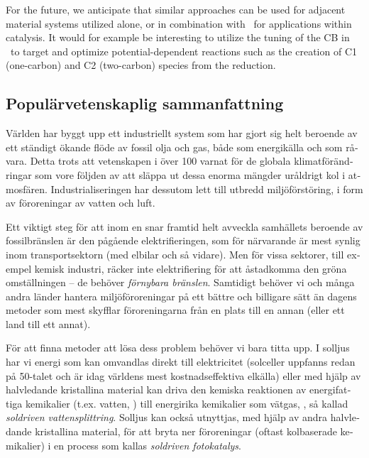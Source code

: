 \documentclass[webedition,openright,titles,swedish,english]{LuaUUThesis}\usepackage[]{graphicx}\usepackage[]{xcolor}
\begin{document}
For the future, we anticipate that similar approaches can be used for adjacent
material systems utilized alone, or in combination with \ZnO\ for applications
within catalysis.
It would for example be interesting to utilize the tuning of
the \gls{CB} in \ZnO\ to target and optimize potential-dependent reactions
such as the creation of C1 (one-carbon) and C2 (two-carbon) species from the  reduction.






\begin{otherlanguage}{swedish}
\chapter{Populärvetenskaplig sammanfattning}
\label{ch:sammanfattning}

%

Världen har byggt upp ett industriellt system som har gjort sig helt
beroende av ett ständigt ökande flöde av fossil olja och gas, både som
energikälla och som råvara.
Detta trots att vetenskapen i över \qty{100}{\yearswe} varnat för de globala
klimatförändringar som vore följden av att släppa ut dessa enorma mängder
uråldrigt kol i atmosfären.
Industrialiseringen har dessutom lett till utbredd miljöförstöring, i form av
föroreningar av vatten och luft.

Ett viktigt steg för att inom en snar framtid helt avveckla
samhällets beroende av fossilbränslen är den pågående elektrifieringen,
som för närvarande är mest synlig inom transportsektorn (med elbilar och så vidare).
Men för vissa sektorer, till exempel kemisk industri,
räcker inte elektrifiering för att åstadkomma den gröna omställningen --
de behöver \emph{förnybara bränslen}.
Samtidigt behöver vi och många andra länder hantera miljöföroreningar på ett bättre
och billigare sätt än dagens metoder som mest skyfflar föroreningarna från
en plats till en annan (eller ett land till ett annat).

För att finna metoder att lösa dess problem behöver vi bara titta upp.
I solljus har vi energi som kan omvandlas direkt till elektricitet
(solceller uppfanns redan på 50-talet och är idag världens mest kostnadseffektiva elkälla)
eller med hjälp av halvledande kristallina material kan driva den kemiska
reaktionen av energifattiga kemikalier (t.ex. vatten, \water) till
energirika kemikalier som vätgas, \hydrogen, så kallad \emph{soldriven vattensplittring}.
Solljus kan också utnyttjas, med hjälp av andra halvledande kristallina material,
för att bryta ner föroreningar (oftast kolbaserade kemikalier) i en process
som kallas \emph{soldriven fotokatalys}.


\end{otherlanguage}
\end{document}
